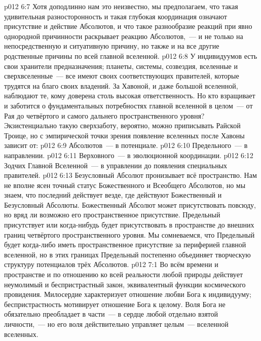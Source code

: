 \vs p012 6:7 Хотя доподлинно нам это неизвестно, мы предполагаем, что такая удивительная разносторонность и такая глубокая координация означают присутствие и действие Абсолютов, и что такое разнообразие реакций при явно однородной причинности раскрывает реакцию Абсолютов,~--- и не только на непосредственную и ситуативную причину, но также и на все другие родственные причины по всей главной вселенной.
\vs p012 6:8 \pc У индивидуумов есть свои хранители предназначения; планеты, системы, созвездия, вселенные и сверхвселенные~--- все имеют своих соответствующих правителей, которые трудятся на благо своих владений. За Хавоной, и даже большой вселенной, наблюдают те, кому доверена столь высокая ответственность. Но кто взращивает и заботится о фундаментальных потребностях главной вселенной в целом~--- от Рая до четвёртого и самого дальнего пространственного уровня? Экзистенциально такую сверхзаботу, вероятно, можно приписывать Райской Троице, но с эмпирической точки зрения появление вселенных после Хавоны зависит от:
\vs p012 6:9 Абсолютов~--- в потенциале.
\vs p012 6:10 Предельного~--- в направлении.
\vs p012 6:11 Верховного~--- в эволюционной координации.
\vs p012 6:12 Зодчих Главной Вселенной~--- в управлении до появления специальных правителей.
\vs p012 6:13 \pc Безусловный Абсолют пронизывает всё пространство. Нам не вполне ясен точный статус Божественного и Всеобщего Абсолютов, но мы знаем, что последний действует везде, где действуют Божественный и Безусловный Абсолюты. Божественный Абсолют может присутствовать повсюду, но вряд ли возможно его пространственное присутствие. Предельный присутствует или когда\hyp{}нибудь будет присутствовать в пространстве до внешних границ четвёртого пространственного уровня. Мы сомневаемся, что Предельный будет когда\hyp{}либо иметь пространственное присутствие за периферией главной вселенной, но в этих границах Предельный постепенно объединяет творческую структуру потенциалов трёх Абсолютов.
\vs p012 7:1 Во всём времени и пространстве и по отношению ко всей реальности любой природы действует неумолимый и беспристрастный закон, эквивалентный функции космического провидения. Милосердие характеризует отношение любви Бога к индивидууму; беспристрастность мотивирует отношение Бога к целому. Воля Бога не обязательно преобладает в части~--- в сердце любой отдельно взятой личности,~--- но его воля действительно управляет целым~--- вселенной вселенных.
